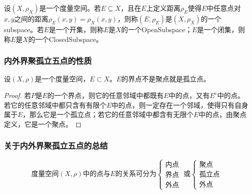 \begin{definition}
	设$(X,\rho_X)$是一个度量空间。若$E\subseteq X$，且在$E$上定义距离$\rho_E$使得$E$中任意点对$x,y$之间的距离$\rho_E(x,y)=\rho_X(x,y)$，则称$(E,\rho_E)$是$(X,\rho_X)$的一个\gls{subspace}。若$E$是一个开集，则称$E$是$X$的一个\gls{OpenSubspace}；$E$是一个闭集，则称$E$是$X$的一个\gls{ClosedSubspace}。
\end{definition}
\subsubsection{内外界聚孤立五点的性质}
\begin{theorem}
	设$(X,\rho)$是一个度量空间，$E\subset X$。$E$的界点不是聚点就是孤立点。
\end{theorem}
\begin{proof}
	若$P$是$E$的一个界点，则它的任意邻域中都既有$E$中的点，又有$E^c$中的点。若它的任意邻域中都只含有有限个$E$中的点，则一定存在一个邻域，使得只有自身属于$E$，那么它是一个孤立点；若它的任意邻域中都含有无限个$E$中的点，由聚点定义，它是一个聚点。
\end{proof}
\subsubsection{关于内外界聚孤立五点的总结}
\begin{equation*}
	\text{度量空间}(X,\rho)\text{中的点与$E$的关系可分为}
	\begin{cases}
		\text{内点} \\
		\text{界点} \\
		\text{外点}    
	\end{cases}\;\text{或}
	\begin{cases}
		\text{聚点}   \\
		\text{孤立点} \\
		\text{外点}    
	\end{cases}
\end{equation*}
